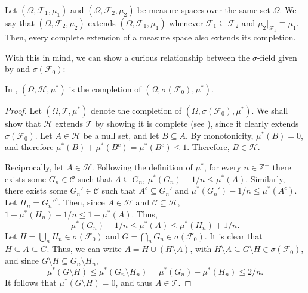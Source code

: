 \begin{remk}\label{remark:minimality of completion} Let
\((\Omega,\mathcal{F}_1,\mu_1)\) and \((\Omega,\mathcal{F}_2,\mu_2)\) be measure spaces over the
same set \(\Omega\). We say that \((\Omega,\mathcal{F}_2,\mu_2)\) extends
\((\Omega,\mathcal{F}_1,\mu_1)\) whenever \(\mathcal{F}_1\subseteq\mathcal{F}_2\) and
\(\mu_2\vert_{\mathcal{F}_1}\equiv\mu_1\). Then, every
complete extension of a measure space also extends its completion.
\end{remk}

With this in mind, we can show a curious relationship between the
\(\sigma\)-field given by  and \(\sigma(\mathcal{F}_0)\):

\begin{prop} In , \((\Omega,\mathcal{H},\mu^*)\) is
the completion of \((\Omega,\sigma(\mathcal{F}_0),\mu^*)\).
\end{prop}
\begin{proof} Let \((\Omega,\mathcal{T},\mu^*)\) denote the completion of
\((\Omega,\sigma(\mathcal{F}_0),\mu^*)\). We shall show that \(\mathcal{H}\) extends
\(\mathcal{T}\) by showing it is complete (see ), since it clearly extends \(\sigma(\mathcal{F}_0)\). Let \(A\in\mathcal{H}\) be a
null set, and let \(B\subseteq A\). By monotonicity, \(\mu^*(B)=0\), and
therefore \(\mu^*(B)+\mu^*(B^c)=\mu^*(B^c)\leq 1\). Therefore, \(B\in\mathcal{H}\).
	
	Reciprocally, let \(A\in\mathcal{H}\). Following the definition of \(\mu^*\), for
every \(n\in\mathbb{Z}^+\) there exists some \(G_n\in\mathcal{C}\) such that \(A\subseteq G_n\),
\(\mu^*(G_n)-1/n\leq\mu^*(A)\). Similarly, there exists some \(G_n'\in\mathcal{C}\) such
that \(A^c\subseteq G_n'\) and \(\mu^*(G_n')-1/n\leq\mu^*(A^c)\). Let
\(H_n=G_n'^c\). Then, since \(A\in\mathcal{H}\) and \(\mathcal{C}\subseteq\mathcal{H}\),
\(1-\mu^*(H_n)-1/n\leq1-\mu^*(A)\). Thus,
	\[\mu^*(G_n)-1/n\leq\mu^*(A)\leq\mu^*(H_n)+1/n.\] Let
\(H=\bigcup_nH_n\in\sigma(\mathcal{F}_0)\) and \(G=\bigcap_nG_n\in\sigma(\mathcal{F}_0)\). It is
clear that \(H\subseteq A\subseteq G\). Thus, we can write
\(A=H\cup (H\setminus A)\), with
\(H\setminus A\subseteq G\setminus H\in\sigma(\mathcal{F}_0)\), and since
\(G\setminus H\subseteq G_n\setminus H_n\),
	\[\mu^*(G\setminus H)\leq\mu^*(G_n\setminus H_n)=\mu^*(G_n)-\mu^*(H_n)\leq 2/n.\]
It follows that \(\mu^*(G\setminus H)=0\), and thus \(A\in\mathcal{T}\).
\end{proof}
